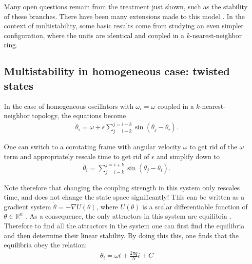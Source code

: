 Many open questions remain from the treatment just shown, such as the stability of these branches. There have been many extensions made to this model \cite{acebron2005kuramoto, rodrigues2016the}. In the context of multistability, some basic results come from studying an even simpler configuration, where the units are identical and coupled in a $k$-nearest-neighbor ring.

\subsection{Multistability in homogeneous case: twisted states}
In the case of homogeneous oscillators with $\omega_i = \omega$ coupled in a $k$-nearest-neighbor topology, the equations become 
%
\begin{align}
    \dot{\theta}_i = \omega + \epsilon \sum_{j=i-k}^{j=i+k} \sin(\theta_j - \theta_i).
\end{align}

One can switch to a corotating frame with angular velocity $\omega$ to get rid of the $\omega$ term and appropriately rescale time to get rid of $\epsilon$ and simplify down to 
%
\begin{align}
    \dot{\theta}_i = \sum_{j=i-k}^{j=i+k} \sin(\theta_j - \theta_i).
\end{align}

Note therefore that changing the coupling strength in this system only rescales time, and does not change the state space significantly! This can be written as a gradient system $\dot{\theta} = - \nabla U(\theta)$, where $U(\theta)$ is a scalar differentiable function of $\theta \in \mathbb{R}^n$ \cite{wiley2006the, strogatz2002nonlinear}. As a consequence, the only attractors in this system are equilibria \cite{wiley2006the}. Therefore to find all the attractors in the system one can first find the equilibria and then determine their linear stability. By doing this this, one finds that the equilibria obey the relation:
%
\begin{align}
    \theta_i = \omega t + \frac{2\pi q}{N} i + C
\end{align}

